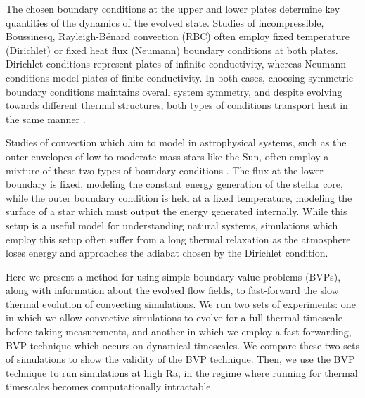 \documentclass[aps, pre, onecolumn, nofootinbib, notitlepage, groupedaddress, amsfonts, amssymb, amsmath, longbibliography]{revtex4-1}
\newcommand{\RB}{Rayleigh-B\'{e}nard }
\begin{document}
The chosen boundary conditions at the upper and lower plates
determine key quantities of the dynamics of the evolved state.
Studies of incompressible, Boussinesq, \RB convection (RBC) often
employ fixed temperature (Dirichlet) or fixed heat flux
(Neumann) boundary conditions at both plates.  
Dirichlet conditions represent plates of infinite conductivity,
whereas Neumann conditions model plates of finite conductivity.  
In both cases, choosing symmetric boundary conditions maintains overall system symmetry, 
and despite evolving towards different thermal structures, both types of conditions
transport heat in the same manner \cite{johnston&doering2009}.

Studies of convection which aim to model
in astrophysical systems, such as the outer envelopes of low-to-moderate mass stars 
like the Sun, often employ a mixture of these
two types of boundary conditions \cite{hurlburt&all1984, cattaneo&all1991, korre&all2017}.  
The flux at the lower boundary is fixed, modeling
the constant energy generation of the stellar core, 
while the outer boundary condition is held at a fixed temperature,
modeling the surface of a star which must output the energy generated internally.
While this setup is a useful model for understanding natural
systems, simulations which employ this setup often suffer from a long 
thermal relaxation as the atmosphere loses energy and approaches the adiabat chosen by the
Dirichlet condition.

Here we present a method for using simple boundary value problems (BVPs), 
along with information about the evolved flow fields,
to fast-forward the slow thermal evolution of convecting simulations.  
We run two sets of experiments: one in which we allow convective simulations to evolve for a
full thermal timescale before taking measurements, and another in which we employ a fast-forwarding,
BVP technique which occurs on dynamical timescales. We compare these two sets of simulations to
show the validity of the BVP technique.  Then, we use the BVP technique to run simulations
at high Ra, in the regime where running for thermal timescales becomes computationally intractable.
\end{document}

